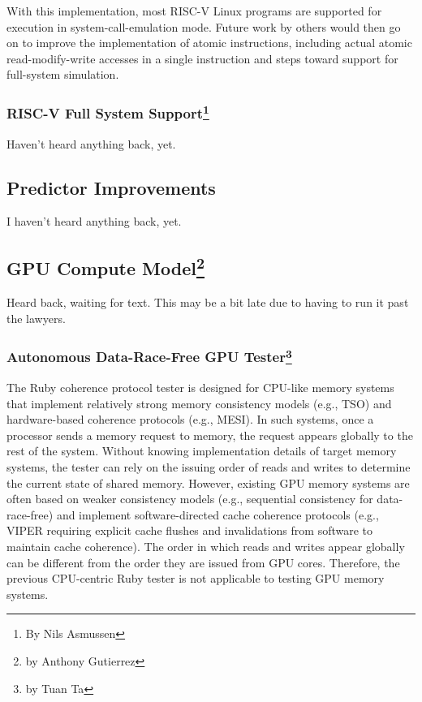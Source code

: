 With this implementation, most RISC-V Linux programs are supported for execution in system-call-emulation mode.  Future work by others would then go on to improve the implementation of atomic instructions, including actual atomic read-modify-write accesses in a single instruction and steps toward support for full-system simulation.

\subsubsection[RISC-V Full System Support]{RISC-V Full System Support\footnote{By Nils Asmussen}}

Haven't heard anything back, yet.

\subsection{Predictor Improvements}

I haven't heard anything back, yet.

\subsection[GPU Compute Model]{GPU Compute Model\footnote{by Anthony Gutierrez}}

Heard back, waiting for text.
This may be a bit late due to having to run it past the lawyers.

\subsubsection[Autonomous Data-Race-Free GPU Tester]{Autonomous Data-Race-Free GPU Tester\footnote{by Tuan Ta}}

The Ruby coherence protocol tester is designed for CPU-like memory systems that implement relatively strong memory consistency models (e.g., TSO) and hardware-based coherence protocols (e.g., MESI).
In such systems, once a processor sends a memory request to memory, the request appears globally to the rest of the system.
Without knowing implementation details of target memory systems, the tester can rely on the issuing order of reads and writes to determine the current state of shared memory.
However, existing GPU memory systems are often based on weaker consistency models (e.g., sequential consistency for data-race-free) and implement software-directed cache coherence protocols (e.g., VIPER requiring explicit cache flushes and invalidations from software to maintain cache coherence).
The order in which reads and writes appear globally can be different from the order they are issued from GPU cores.
Therefore, the previous CPU-centric Ruby tester is not applicable to testing GPU memory systems.

